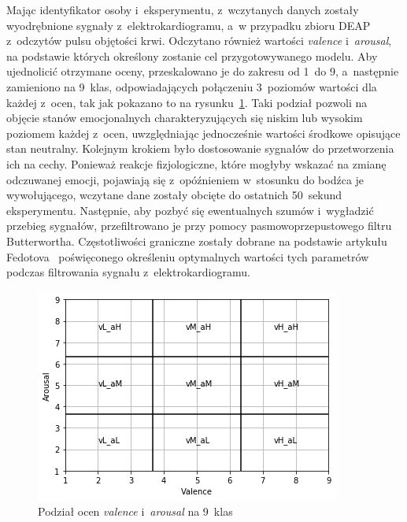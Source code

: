 Mając identyfikator osoby i~eksperymentu, z~wczytanych danych zostały wyodrębnione sygnały z~elektrokardiogramu, a~w przypadku zbioru DEAP z~odczytów pulsu objętości krwi. Odczytano również wartości \textit{valence} i~\textit{arousal}, na podstawie których określony zostanie cel przygotowywanego modelu. Aby ujednolicić otrzymane oceny, przeskalowano je do zakresu od 1~do 9, a~następnie zamieniono na 9~klas, odpowiadających połączeniu 3~poziomów wartości dla każdej z~ocen, tak jak pokazano to na rysunku~\ref{fig:model_classes}. Taki podział pozwoli na objęcie stanów emocjonalnych charakteryzujących się niskim lub wysokim poziomem każdej z~ocen, uwzględniając jednocześnie wartości środkowe opisujące stan neutralny. Kolejnym krokiem było dostosowanie sygnałów do przetworzenia ich na cechy. Ponieważ reakcje fizjologiczne, które mogłyby wskazać na zmianę odczuwanej emocji, pojawiają się z~opóźnieniem w~stosunku do bodźca je wywołującego, wczytane dane zostały obcięte do ostatnich 50~sekund eksperymentu. Następnie, aby pozbyć się ewentualnych szumów i~wygładzić przebieg sygnałów, przefiltrowano je przy pomocy pasmowoprzepustowego filtru Butterwortha. Częstotliwości graniczne zostały dobrane na podstawie artykułu Fedotova~\cite{fedotov_optimal_cutoff_2016} poświęconego określeniu optymalnych wartości tych parametrów podczas filtrowania sygnału z~elektrokardiogramu.
\begin{figure}
	\centering
	\includegraphics[width=0.5\linewidth]{images/model_classes.png}
	\caption{Podział ocen \textit{valence} i~\textit{arousal} na 9~klas}
	\label{fig:model_classes}
\end{figure}

